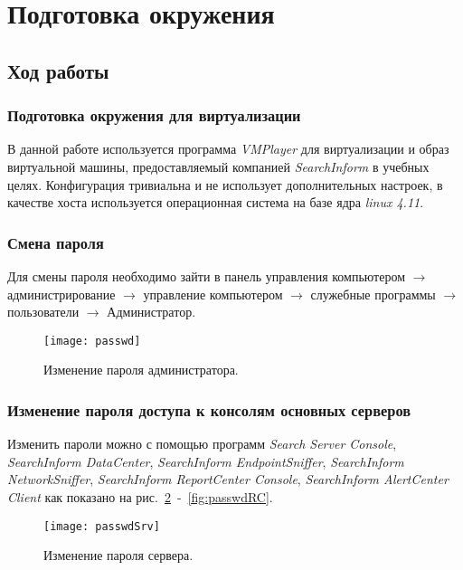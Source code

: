 \section{Подготовка окружения}

\subsection{Ход работы}

\subsubsection{Подготовка окружения для виртуализации}


В данной работе используется программа \textit{VMPlayer} для виртуализации и
образ виртуальной машины, предоставляемый компанией \textit{SearchInform} в
учебных целях. Конфигурация тривиальна и не использует дополнительных настроек,
в качестве хоста используется операционная система на базе ядра
\textit{linux 4.11}.

\subsubsection{Смена пароля}

Для смены пароля необходимо зайти в панель управления компьютером $\rightarrow$
администрирование $\rightarrow$ управление компьютером $\rightarrow$ служебные
программы $\rightarrow$ пользователи $\rightarrow$ Администратор.

\begin{figure}[H]
  \centering
  \texttt{[image: passwd]}
  \caption{Изменение пароля администратора.}\label{fig:passwd}
\end{figure}

\subsubsection{Изменение пароля доступа к консолям основных серверов}

Изменить пароли можно с помощью программ \textit{Search Server Console},
\textit{SearchInform DataCenter}, \textit{SearchInform EndpointSniffer},
\textit{SearchInform NetworkSniffer}, \textit{SearchInform ReportCenter
Console}, \textit{SearchInform AlertCenter Client} как показано на
рис.~\ref{fig:passwdSrv}~-~\ref{fig:passwdRC}.

\begin{figure}[H]
  \centering
  \texttt{[image: passwdSrv]}
  \caption{Изменение пароля сервера.}\label{fig:passwdSrv}
\end{figure}

